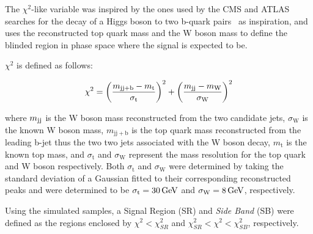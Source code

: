 
The $\chi^{2}$-like variable was inspired by the ones used by the CMS and ATLAS searches for the decay of a Higgs boson to two b-quark pairs~\cite{CMS:2016tlj,TheATLAScollaboration:2016myw} as inspiration, and uses the reconstructed top quark mass and the W boson mass to define the blinded region in phase space where the signal is expected to be.


$\chi^{2}$ is defined as follows:

\begin{equation}\label{eq:blindingChi2}
   \chi^{2} = {\left(\frac{m_{\mathrm{jj+b}}-m_{\mathrm{t}}}{\sigma_{\mathrm{t}}}\right)}^{2} + {\left(\frac{m_{\rm jj}-m_{\rm W}}{\sigma_{\mathrm{W}}}\right)}^{2}
\end{equation}

where $m_{\rm jj}$ is the W boson mass reconstructed from the two candidate jets, $\sigma_{\mathrm{W}}$ is the known W boson mass, $m_{\mathrm{jj+b}}$ is the top quark mass reconstructed from the leading b-jet thus the two two jets associated with the W boson decay, $m_{\mathrm{t}}$ is the known top mass, and $\sigma_{\mathrm{t}}$ and $\sigma_{\mathrm{W}}$ represent the mass resolution for the top quark and W boson respectively.
Both $\sigma_{\mathrm{t}}$ and $\sigma_{\mathrm{W}}$ were determined by taking the standard deviation of a Gaussian fitted to their corresponding reconstructed peaks and were determined to be $\sigma_{\mathrm{t}} = 30\,\text{Ge\hspace{-.08em}V}$ and $\sigma_{\mathrm{W}} = 8\,\text{Ge\hspace{-.08em}V}$, respectively.

Using the simulated samples, a Signal Region (SR) and \emph{Side Band} (SB) were defined as the regions enclosed by $\chi^{2} < \chi^{2}_{SR}$ and $\chi^{2}_{SR} < \chi^{2} < \chi^{2}_{SB}$, respectively.

